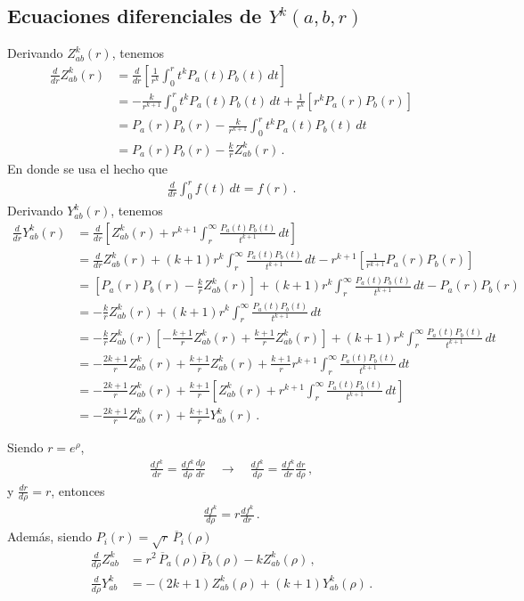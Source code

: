 \documentclass[11pt]{article}
\begin{document}
\subsection{Ecuaciones diferenciales de $Y^k(a,b,r)$}
Derivando $Z_{ab}^k(r)$, tenemos
\begin{align}
 \frac{d}{dr} Z_{ab}^k(r) 
 &= \frac{d}{dr} \left[ \frac{1}{r^k} \int_0^r t^k P_a(t)P_b(t)\,dt \right] \\
 &= -\frac{k}{r^{k+1}}\int_0^r t^k P_a(t)P_b(t)\,dt + \frac{1}{r^k} \left[ r^k P_a(r)P_b(r) \right] \\
 &= P_a(r)P_b(r) -\frac{k}{r^{k+1}}\int_0^r t^k P_a(t)P_b(t)\,dt \\
 &= P_a(r)P_b(r) - \frac{k}{r} Z_{ab}^k(r)  \,.
\end{align}
En donde se usa el hecho que
\begin{align}
 \frac{d}{dr} \int_0^r f(t)\,dt = f(r)\,.
\end{align}
Derivando $Y_{ab}^k(r)$, tenemos
\begin{align}
 \frac{d}{dr} Y_{ab}^k(r) 
 &= \frac{d}{dr} \left[ Z_{ab}^k(r) 
 + r^{k+1} \int_r^{\infty} \frac{P_a(t)P_b(t)}{t^{k+1}}\,dt \right] \\
 &= \frac{d}{dr} Z_{ab}^k(r) + (k+1) r^k \int_r^{\infty} \frac{P_a(t)P_b(t)}{t^{k+1}}\,dt 
 - r^{k+1}\left[ \frac{1}{r^{k+1}} P_a(r)P_b(r) \right] \\
 &= \left[ P_a(r)P_b(r) - \frac{k}{r} Z_{ab}^k(r) \right]
 + (k+1) r^k \int_r^{\infty} \frac{P_a(t)P_b(t)}{t^{k+1}}\,dt - P_a(r)P_b(r) \\
 &= -\frac{k}{r} Z_{ab}^k(r) 
 + (k+1) r^k \int_r^{\infty} \frac{P_a(t)P_b(t)}{t^{k+1}}\,dt \\
 &= -\frac{k}{r} Z_{ab}^k(r)  \left[ - \frac{k+1}{r} Z_{ab}^k(r) + \frac{k+1}{r} Z_{ab}^k(r) \right]
 + (k+1) r^k \int_r^{\infty} \frac{P_a(t)P_b(t)}{t^{k+1}}\,dt  \\
 &= -\frac{2k+1}{r} Z_{ab}^k(r) + \frac{k+1}{r} Z_{ab}^k(r)
 + \frac{k+1}{r} r^{k+1} \int_r^{\infty} \frac{P_a(t)P_b(t)}{t^{k+1}}\,dt \\
 &= -\frac{2k+1}{r} Z_{ab}^k(r) + \frac{k+1}{r} \left[ Z_{ab}^k(r)
 + r^{k+1} \int_r^{\infty} \frac{P_a(t)P_b(t)}{t^{k+1}}\,dt \right] \\
 &= -\frac{2k+1}{r} Z_{ab}^k(r) + \frac{k+1}{r} Y_{ab}^k(r)\,.
\end{align}

Siendo $r=e^{\rho}$,
\begin{align}
 \frac{df^k}{dr}=\frac{df^k}{d\rho}\frac{d\rho}{dr} \quad\rightarrow\quad 
 \frac{df^k}{d\rho}=\frac{df^k}{dr}\frac{dr}{d\rho}\,,
\end{align}
y $\frac{dr}{d\rho}=r$, entonces
\begin{align}
 \frac{df^k}{d\rho}=r\frac{df^k}{dr}\,.
\end{align}
Además, siendo $P_i(r)=\sqrt{r}\,\overline{P}_i(\rho)$
\begin{align}
 \frac{d}{d\rho} Z_{ab}^k &=  r^2\,\overline{P}_a(\rho)\overline{P}_b(\rho) - k Z_{ab}^k(\rho)\,, \\
 \frac{d}{d\rho} Y_{ab}^k &=  -(2k+1) Z_{ab}^k(\rho) + (k+1) Y_{ab}^k(\rho)\,.
\end{align}
\end{document}
